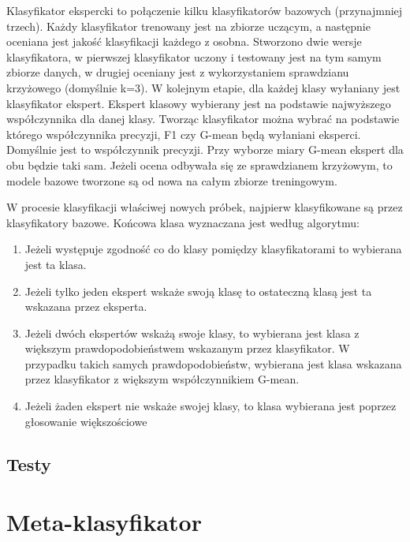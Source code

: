 Klasyfikator ekspercki to połączenie kilku klasyfikatorów bazowych (przynajmniej trzech). Każdy klasyfikator trenowany jest na zbiorze uczącym, a następnie oceniana jest jakość klasyfikacji każdego z osobna. Stworzono dwie wersje klasyfikatora, w pierwszej klasyfikator uczony i testowany jest na tym samym zbiorze danych, w drugiej oceniany jest z wykorzystaniem sprawdzianu krzyżowego (domyślnie k=3). W kolejnym etapie, dla każdej klasy wyłaniany jest klasyfikator ekspert. Ekspert klasowy wybierany jest na podstawie najwyższego współczynnika dla danej klasy. Tworząc klasyfikator można wybrać na podstawie którego współczynnika precyzji, F1 czy G-mean będą wyłaniani eksperci. Domyślnie jest to współczynnik precyzji. Przy wyborze miary G-mean ekspert dla obu będzie taki sam. Jeżeli ocena odbywała się ze sprawdzianem krzyżowym, to modele bazowe tworzone są od nowa na całym zbiorze treningowym. \par
W procesie klasyfikacji właściwej nowych próbek, najpierw klasyfikowane są przez klasyfikatory bazowe. Końcowa klasa wyznaczana jest według algorytmu:
\begin{enumerate}
	\item Jeżeli występuje zgodność co do klasy pomiędzy klasyfikatorami to wybierana jest ta klasa.
	\item Jeżeli tylko jeden ekspert wskaże swoją klasę to ostateczną klasą jest ta wskazana przez eksperta.
	\item Jeżeli dwóch ekspertów wskażą swoje klasy, to wybierana jest klasa z większym prawdopodobieństwem wskazanym przez klasyfikator. W przypadku takich samych prawdopodobieństw, wybierana jest klasa wskazana przez klasyfikator z większym współczynnikiem G-mean.
	\item Jeżeli żaden ekspert nie wskaże swojej klasy, to klasa wybierana jest poprzez głosowanie większościowe
\end{enumerate}
\subsection{Testy}

\section{Meta-klasyfikator}

